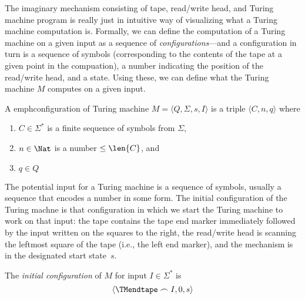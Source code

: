 \documentclass[../../include/open-logic-section]{subfiles}
\begin{document}

\begin{wordy}
The imaginary mechanism consisting of tape, read/write head, and
Turing machine program is really just in intuitive way of visualizing
what a Turing machine computation is.  Formally, we can define the
computation of a Turing machine on a given input as a sequence of
\emph{configurations}---and a configuration in turn is a sequence of
symbols (corresponding to the contents of the tape at a given point in
the compuation), a number indicating the position of the read/write
head, and a state.  Using these, we can define what the Turing machine
$M$ computes on a given input.
\end{wordy}

\begin{defn}
A emph{configuration} of Turing machine $M = \langle Q, \Sigma, s,
I\rangle$ is a triple $\langle C, n, q\rangle$ where
\begin{enumerate}
\item $C \in \Sigma^*$ is a finite sequence of symbols from $\Sigma$,
\item $n \in \Nat$ is a number $\le \len{C}$, and
\item $q \in Q$ 
\end{enumerate}
\end{defn}

\begin{wordy}
The potential input for a Turing machine is a sequence of symbols,
usually a sequence that encodes a number in some form.  The initial
configuration of the Turing machne is that configuration in which we
start the Turing machine to work on that input: the tape contains the
tape end marker immediately followed by the input written on the
squares to the right, the read/write head is scanning the leftmost
square of the tape (i.e., the left end marker), and the mechanism is
in the designated start state~$s$.
\end{wordy}

\begin{defn}
The \emph{initial configuration} of $M$ for input $I \in \Sigma^*$ is
\[
\langle \TMendtape \frown I, 0, s\rangle
\]
\end{defn}
\end{document}
